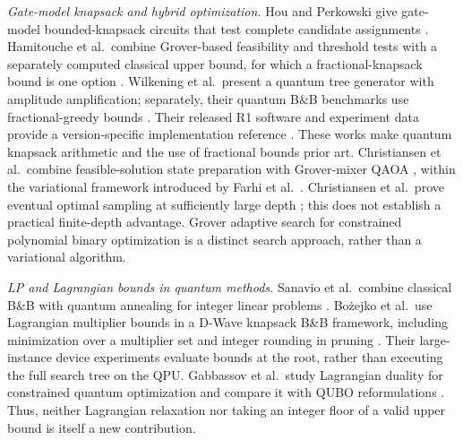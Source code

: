 \documentclass[referee,pdflatex,sn-mathphys-num]{sn-jnl}
\theoremstyle{thmstyleone}
\theoremstyle{thmstyletwo}
\begin{document}
\textit{Gate-model knapsack and hybrid optimization.} Hou and Perkowski give gate-model bounded-knapsack circuits that test complete candidate assignments \cite{hou2020}. Hamitouche et al.\ combine Grover-based feasibility and threshold tests with a separately computed classical upper bound, for which a fractional-knapsack bound is one option \cite{hamitouche2025}. Wilkening et al.\ present a quantum tree generator with amplitude amplification; separately, their quantum B\&B benchmarks use fractional-greedy bounds \cite{wilkening2025}. Their released R1 software and experiment data provide a version-specific implementation reference \cite{wilkening2025code}. These works make quantum knapsack arithmetic and the use of fractional bounds prior art. Christiansen et al.\ combine feasible-solution state preparation with Grover-mixer QAOA \cite{ref23}, within the variational framework introduced by Farhi et al.\ \cite{ref25}. Christiansen et al.\ prove eventual optimal sampling at sufficiently large depth \cite{ref23}; this does not establish a practical finite-depth advantage. Grover adaptive search for constrained polynomial binary optimization \cite{ref26} is a distinct search approach, rather than a variational algorithm.

\textit{LP and Lagrangian bounds in quantum methods.} Sanavio et al.\ combine classical B\&B with quantum annealing for integer linear problems \cite{ref36}. Bo\.{z}ejko et al.\ use Lagrangian multiplier bounds in a D-Wave knapsack B\&B framework, including minimization over a multiplier set and integer rounding in pruning \cite{bozejko2026}. Their large-instance device experiments evaluate bounds at the root, rather than executing the full search tree on the QPU. Gabbassov et al.\ study Lagrangian duality for constrained quantum optimization and compare it with QUBO reformulations \cite{gabbassov2025}. Thus, neither Lagrangian relaxation nor taking an integer floor of a valid upper bound is itself a new contribution.
\end{document}
